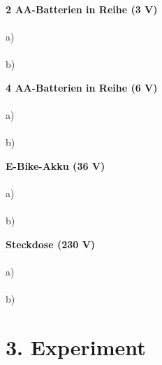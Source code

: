 \documentclass[a4paper,12pt]{article}
\begin{document}
	\vspace{0.3 cm}
	\textbf{2 AA-Batterien in Reihe (3 V)}   \\
	\vspace{0.3 cm}\\
	a) \underline{\hspace{15 cm}}   \\
	\vspace{0.3 cm}\\
	b) \underline{\hspace{15 cm}}

	
	\vspace{0.3 cm}
	\textbf{4 AA-Batterien in Reihe (6 V)}   \\
	\vspace{0.3 cm}\\
	a) \underline{\hspace{15 cm}}   \\
	\vspace{0.3 cm}\\
	b) \underline{\hspace{15 cm}}
		
\newpage
	\vspace{0.3 cm}
	\textbf{E-Bike-Akku (36 V)}   \\
	\vspace{0.3 cm}\\
	a) \underline{\hspace{15 cm}}   \\
	\vspace{0.3 cm}\\
	b) \underline{\hspace{15 cm}}
	
	\vspace{0.3 cm}
	\textbf{Steckdose (230 V)}   \\
	\vspace{0.3 cm}\\
	a) \underline{\hspace{15 cm}}   \\
	\vspace{0.3 cm}\\
	b) \underline{\hspace{15 cm}}


	
\section*{3. Experiment}
\end{document}
